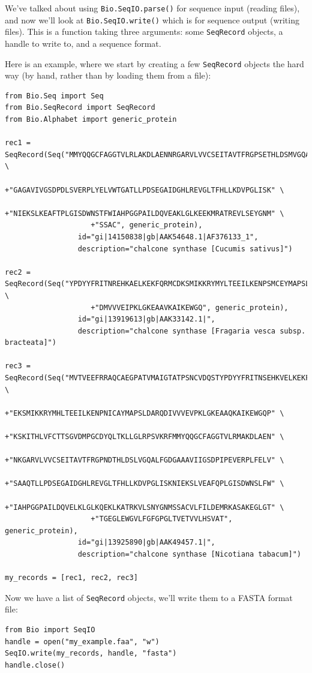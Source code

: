 \documentclass{report}
\begin{document}
We've talked about using \verb|Bio.SeqIO.parse()| for sequence input (reading files), and now we'll look at \verb|Bio.SeqIO.write()| which is for sequence output (writing files).  This is a function taking three arguments: some \verb|SeqRecord| objects, a handle to write to, and a sequence format.

Here is an example, where we start by creating a few \verb|SeqRecord| objects the hard way (by hand, rather than by loading them from a file):

\begin{verbatim}
from Bio.Seq import Seq
from Bio.SeqRecord import SeqRecord
from Bio.Alphabet import generic_protein

rec1 = SeqRecord(Seq("MMYQQGCFAGGTVLRLAKDLAENNRGARVLVVCSEITAVTFRGPSETHLDSMVGQALFGD" \
                    +"GAGAVIVGSDPDLSVERPLYELVWTGATLLPDSEGAIDGHLREVGLTFHLLKDVPGLISK" \
                    +"NIEKSLKEAFTPLGISDWNSTFWIAHPGGPAILDQVEAKLGLKEEKMRATREVLSEYGNM" \
                    +"SSAC", generic_protein),
                 id="gi|14150838|gb|AAK54648.1|AF376133_1",
                 description="chalcone synthase [Cucumis sativus]")

rec2 = SeqRecord(Seq("YPDYYFRITNREHKAELKEKFQRMCDKSMIKKRYMYLTEEILKENPSMCEYMAPSLDARQ" \
                    +"DMVVVEIPKLGKEAAVKAIKEWGQ", generic_protein),
                 id="gi|13919613|gb|AAK33142.1|",
                 description="chalcone synthase [Fragaria vesca subsp. bracteata]")

rec3 = SeqRecord(Seq("MVTVEEFRRAQCAEGPATVMAIGTATPSNCVDQSTYPDYYFRITNSEHKVELKEKFKRMC" \
                    +"EKSMIKKRYMHLTEEILKENPNICAYMAPSLDARQDIVVVEVPKLGKEAAQKAIKEWGQP" \
                    +"KSKITHLVFCTTSGVDMPGCDYQLTKLLGLRPSVKRFMMYQQGCFAGGTVLRMAKDLAEN" \
                    +"NKGARVLVVCSEITAVTFRGPNDTHLDSLVGQALFGDGAAAVIIGSDPIPEVERPLFELV" \
                    +"SAAQTLLPDSEGAIDGHLREVGLTFHLLKDVPGLISKNIEKSLVEAFQPLGISDWNSLFW" \
                    +"IAHPGGPAILDQVELKLGLKQEKLKATRKVLSNYGNMSSACVLFILDEMRKASAKEGLGT" \
                    +"TGEGLEWGVLFGFGPGLTVETVVLHSVAT", generic_protein),
                 id="gi|13925890|gb|AAK49457.1|",
                 description="chalcone synthase [Nicotiana tabacum]")
               
my_records = [rec1, rec2, rec3]
\end{verbatim}

\noindent Now we have a list of \verb|SeqRecord| objects, we'll write them to a FASTA format file:

\begin{verbatim}
from Bio import SeqIO
handle = open("my_example.faa", "w")
SeqIO.write(my_records, handle, "fasta")
handle.close()
\end{verbatim}
\end{document}
